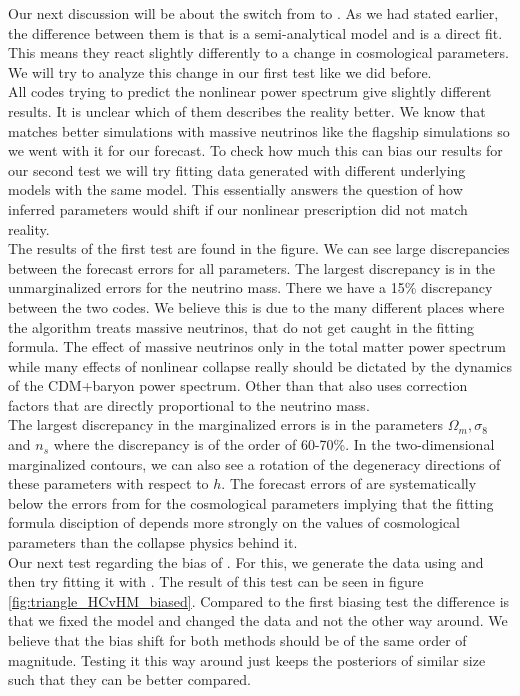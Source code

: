 \documentclass[../main.tex]{subfiles}
\begin{document}
\noindent Our next discussion will be about the switch from \halofit to \hmcode. As we had stated earlier, the difference between them is that \hmcode is a semi-analytical model and \halofit is a direct fit. This means they react slightly differently to a change in cosmological parameters. We will try to analyze this change in our first test like we did before.\\
All codes trying to predict the nonlinear power spectrum give slightly different results. It is unclear which of them describes the reality better. We know that \hmcode matches better simulations with massive neutrinos like the \Euclid flagship simulations so we went with it for our forecast. To check how much this can bias our results for our second test we will try fitting data generated with different underlying models with the same model. This essentially answers the question of how inferred parameters would shift if our nonlinear prescription did not match reality.\\
The results of the first test are found in the figure. We can see large discrepancies between the forecast errors for all parameters. The largest discrepancy is in the unmarginalized errors for the neutrino mass. There we have a  15\% discrepancy between the two codes. We believe this is due to the many different places where the \hmcode algorithm treats massive neutrinos, that do not get caught in the \halofit fitting formula. The effect of massive neutrinos only in the total matter power spectrum while many effects of nonlinear collapse really should be dictated by the dynamics of the CDM+baryon power spectrum. Other than that \hmcode also uses correction factors that are directly proportional to the neutrino mass.\\
The largest discrepancy in the marginalized errors is in the parameters $\Omega_m,\sigma_8$ and $n_s$ where the discrepancy is of the order of 60-70\%. In the two-dimensional marginalized contours, we can also see a rotation of the degeneracy directions of these parameters with respect to $h$. The forecast errors of \halofit are systematically below the errors from \hmcode for the cosmological parameters implying that the fitting formula disciption of \halofit depends more strongly on the values of cosmological parameters than the collapse physics behind it.\\
Our next test regarding the bias of \hmcode. For this, we generate the data using \halofit and then try fitting it with \hmcode. The result of this test can be seen in figure \ref{fig:triangle_HCvHM_biased}. Compared to the first biasing test the difference is that we fixed the model and changed the data and not the other way around. We believe that the bias shift for both methods should be of the same order of magnitude. Testing it this way around just keeps the posteriors of similar size such that they can be better compared.\\
\end{document}

